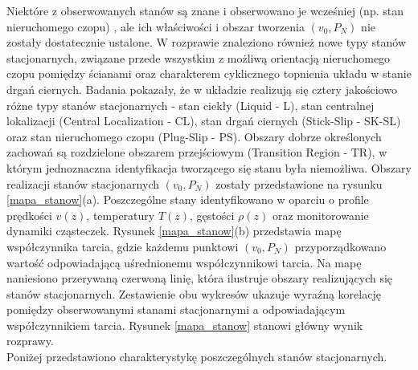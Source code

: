 \documentclass[12pt,a4paper,openright]{report} %
\begin{document}
\linebreak
Niektóre z obserwowanych stanów są znane i obserwowano je wcześniej (np. stan nieruchomego czopu) \cite{DMH1, Gattinoni2013}, ale ich właściwości i obszar tworzenia $(v_0, P_N)$ nie zostały dostatecznie ustalone. W rozprawie znaleziono również nowe typy stanów stacjonarnych, związane przede wszystkim z możliwą orientacją nieruchomego czopu pomiędzy ścianami oraz charakterem cyklicznego topnienia układu w stanie drgań ciernych. 
%
Badania pokazały, że w układzie realizują się cztery jakościowo różne typy stanów stacjonarnych - stan ciekły (Liquid - L), stan centralnej lokalizacji (Central Localization - CL), stan drgań ciernych (Stick-Slip - SK-SL) oraz stan nieruchomego czopu (Plug-Slip - PS). Obszary dobrze określonych zachowań są rozdzielone obszarem przejściowym (Transition Region - TR), w którym jednoznaczna identyfikacja tworzącego się stanu była niemożliwa. \linebreak
Obszary realizacji stanów stacjonarnych $(v_0, P_N)$ zostały przedstawione na rysunku \ref{mapa_stanow}(a). Poszczególne stany identyfikowano w oparciu o profile prędkości $v(z)$, temperatury $T(z)$, gęstości $\rho(z)$ oraz monitorowanie dynamiki cząsteczek. 
%
%
Rysunek \ref{mapa_stanow}(b) przedstawia mapę współczynnika tarcia, gdzie każdemu punktowi $(v_0, P_N)$ przyporządkowano wartość odpowiadającą uśrednionemu współczynnikowi tarcia. Na mapę naniesiono przerywaną czerwoną linię, która ilustruje obszary realizujących się stanów stacjonarnych. Zestawienie obu wykresów ukazuje wyraźną korelację pomiędzy obserwowanymi stanami stacjonarnymi a odpowiadającym współczynnikiem tarcia. Rysunek \ref{mapa_stanow} stanowi główny wynik rozprawy.\\
Poniżej przedstawiono charakterystykę poszczególnych stanów stacjonarnych. 
%
\end{document}

